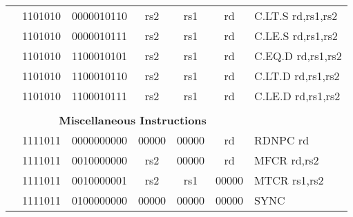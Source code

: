 \begin{table}[p]
\begin{small}
\begin{center}
\begin{tabular}{rcccccccccl}
&
\multicolumn{1}{|c|}{1101010} &
\multicolumn{5}{c|}{0000010110} &
\multicolumn{1}{c|}{rs2} &
\multicolumn{1}{c|}{rs1} &
\multicolumn{1}{c|}{rd} & C.LT.S rd,rs1,rs2 \\
\cline{2-10}
  

&
\multicolumn{1}{|c|}{1101010} &
\multicolumn{5}{c|}{0000010111} &
\multicolumn{1}{c|}{rs2} &
\multicolumn{1}{c|}{rs1} &
\multicolumn{1}{c|}{rd} & C.LE.S rd,rs1,rs2 \\
\cline{2-10}
  

&
\multicolumn{1}{|c|}{1101010} &
\multicolumn{5}{c|}{1100010101} &
\multicolumn{1}{c|}{rs2} &
\multicolumn{1}{c|}{rs1} &
\multicolumn{1}{c|}{rd} & C.EQ.D rd,rs1,rs2 \\
\cline{2-10}
  

&
\multicolumn{1}{|c|}{1101010} &
\multicolumn{5}{c|}{1100010110} &
\multicolumn{1}{c|}{rs2} &
\multicolumn{1}{c|}{rs1} &
\multicolumn{1}{c|}{rd} & C.LT.D rd,rs1,rs2 \\
\cline{2-10}
  

&
\multicolumn{1}{|c|}{1101010} &
\multicolumn{5}{c|}{1100010111} &
\multicolumn{1}{c|}{rs2} &
\multicolumn{1}{c|}{rs1} &
\multicolumn{1}{c|}{rd} & C.LE.D rd,rs1,rs2 \\
\cline{2-10}
  

&
\multicolumn{9}{c}{} & \\
&
\multicolumn{9}{c}{\bf Miscellaneous Instructions} & \\
\cline{2-10}
  

&
\multicolumn{1}{|c|}{1111011} &
\multicolumn{5}{c|}{0000000000} &
\multicolumn{1}{c|}{00000} &
\multicolumn{1}{c|}{00000} &
\multicolumn{1}{c|}{rd} & RDNPC rd \\
\cline{2-10}
  

&
\multicolumn{1}{|c|}{1111011} &
\multicolumn{5}{c|}{0010000000} &
\multicolumn{1}{c|}{rs2} &
\multicolumn{1}{c|}{00000} &
\multicolumn{1}{c|}{rd} & MFCR rd,rs2 \\
\cline{2-10}
  

&
\multicolumn{1}{|c|}{1111011} &
\multicolumn{5}{c|}{0010000001} &
\multicolumn{1}{c|}{rs2} &
\multicolumn{1}{c|}{rs1} &
\multicolumn{1}{c|}{00000} & MTCR rs1,rs2 \\
\cline{2-10}
  

&
\multicolumn{1}{|c|}{1111011} &
\multicolumn{5}{c|}{0100000000} &
\multicolumn{1}{c|}{00000} &
\multicolumn{1}{c|}{00000} &
\multicolumn{1}{c|}{00000} & SYNC  \\
\cline{2-10}
  


\end{tabular}
\end{center}
\end{small}
\end{table}
